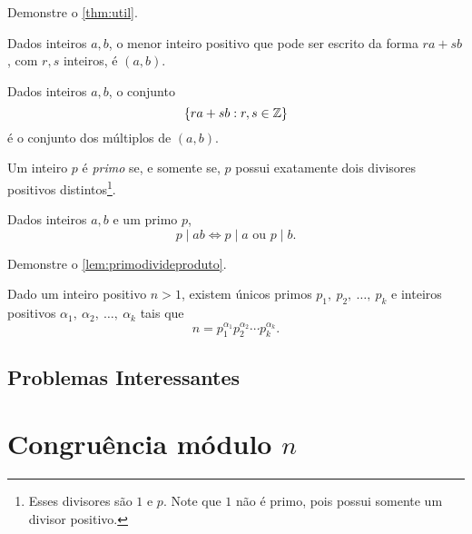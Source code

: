 \documentclass[10pt, a4paper]{report}
\begin{document}
	\begin{exer}
		Demonstre o \cref{thm:util}.
	\end{exer}

	\begin{thm}[Bezout]
		Dados inteiros $a, b$, o menor inteiro positivo que pode ser escrito da forma $ra + sb$, com $r, s$ inteiros, é $(a, b)$.
	\end{thm}

	\begin{cor}
		Dados inteiros $a, b$, o conjunto  \[
			\{ra + sb : r, s \in \mathbb{Z}\}
		\]
		é o conjunto dos múltiplos de $(a, b)$.
	\end{cor}

	\begin{alg}
	\end{alg}

	\begin{defn}
		Um inteiro $p$ é \emph{primo} se, e somente se, $p$ possui exatamente dois divisores positivos distintos\footnote{Esses divisores são $1$ e $p$. Note que $1$ não é primo, pois possui somente um divisor positivo.}.
	\end{defn}

	\begin{lem}\label{lem:primodivideproduto}
		Dados inteiros $a, b$ e um primo $p$, \[
			p \mid ab \iff p \mid a \text{\ ou\ } p \mid b.
		\]
	\end{lem}

	\begin{exer}
		Demonstre o \cref{lem:primodivideproduto}.
	\end{exer}

	\begin{thm}\label{thm:fundamentalaritmetica}
		Dado um inteiro positivo $n > 1$, existem únicos primos $p_1,\ p_2,\ \dots,\ p_k$ e inteiros positivos $\alpha_1,\ \allowbreak \alpha_2,\ \allowbreak \dots,\ \allowbreak \alpha_k$ tais que  \[
			n = p_1^{\alpha_1} p_2^{\alpha_2} \cdots p_k^{\alpha_k}.
		\]
	\end{thm}
	
	\newpage
	\section{Problemas Interessantes}

	\chapter[\texorpdfstring{Congruência módulo $n$}{Congruência módulo n}]{Congruência módulo $n$}
\end{document}
